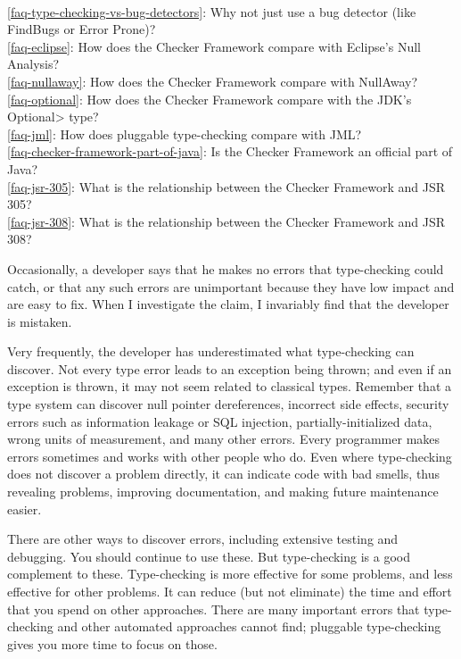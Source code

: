 \\ \ref{faq-type-checking-vs-bug-detectors}: Why not just use a bug detector (like FindBugs or Error Prone)?
\\ \ref{faq-eclipse}: How does the Checker Framework compare with Eclipse's Null Analysis?
\\ \ref{faq-nullaway}: How does the Checker Framework compare with NullAway?
\\ \ref{faq-optional}: How does the Checker Framework compare with the JDK's \<Optional> type?
\\ \ref{faq-jml}: How does pluggable type-checking compare with JML?
\\ \ref{faq-checker-framework-part-of-java}: Is the Checker Framework an official part of Java?
\\ \ref{faq-jsr-305}: What is the relationship between the Checker Framework and JSR 305?
\\ \ref{faq-jsr-308}: What is the relationship between the Checker Framework and JSR 308?




Occasionally, a developer says that he makes no errors that type-checking
could catch, or that any such errors are unimportant because they have low
impact and are easy to fix.  When I investigate the claim, I invariably
find that the developer is mistaken.

Very frequently, the developer has underestimated what type-checking can
discover.  Not every type error leads to an exception being thrown; and
even if an exception is thrown, it may not seem related to classical types.
Remember that a type system can discover
null pointer dereferences,
incorrect side effects,
security errors such as information leakage or SQL injection,
partially-initialized data,
wrong units of measurement,
and many other errors.
Every programmer makes errors sometimes and works with other people
who do.
Even where type-checking does not discover a
problem directly, it can indicate code with bad smells, thus revealing
problems, improving documentation, and making future maintenance easier.

There are other ways to discover errors, including extensive testing and
debugging.  You should continue to use these.
But type-checking is a good complement to these.  Type-checking is more
effective for some problems, and less effective for other problems.  It can
reduce (but not eliminate) the time and effort that you spend on other
approaches.  There are many important errors that type-checking and other
automated approaches cannot find; pluggable type-checking gives you more
time to focus on those.


